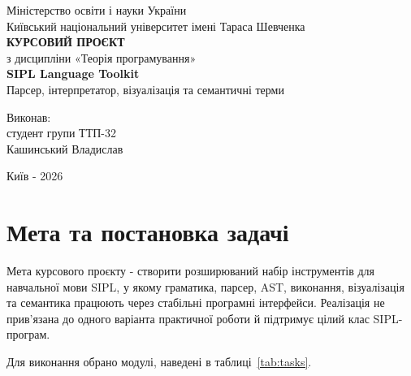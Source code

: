 \documentclass[12pt,a4paper]{article}
\begin{document}
\begin{titlepage}
\begin{center}
  Міністерство освіти і науки України\\
  Київський національний університет імені Тараса Шевченка\\[5em]

  {\Large\bfseries КУРСОВИЙ ПРОЄКТ}\\[1em]
  {\large з дисципліни «Теорія програмування»}\\[2em]

  {\LARGE\bfseries SIPL Language Toolkit}\\[0.7em]
  {\large Парсер, інтерпретатор, візуалізація та семантичні терми}\\[5em]
\end{center}

\begin{flushright}
  Виконав:\\
  студент групи ТТП-32\\
  Кашинський Владислав
\end{flushright}

\vfill
\begin{center}
  Київ - 2026
\end{center}
\end{titlepage}

\tableofcontents
\newpage

\section{Мета та постановка задачі}

Мета курсового проєкту - створити розширюваний набір інструментів для
навчальної мови SIPL, у якому граматика, парсер, AST, виконання,
візуалізація та семантика працюють через стабільні програмні інтерфейси.
Реалізація не прив'язана до одного варіанта практичної роботи й підтримує
цілий клас SIPL-програм.

Для виконання обрано модулі, наведені в таблиці~\ref{tab:tasks}.
\end{document}
